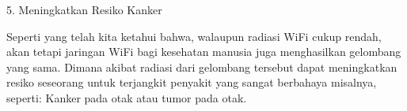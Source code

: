 5. Meningkatkan Resiko Kanker

   Seperti yang telah kita ketahui bahwa, walaupun radiasi WiFi cukup rendah, akan tetapi jaringan WiFi bagi kesehatan manusia juga menghasilkan 
   gelombang yang sama. Dimana akibat radiasi dari gelombang tersebut dapat meningkatkan resiko seseorang untuk terjangkit penyakit yang sangat berbahaya
   misalnya, seperti: Kanker pada otak atau tumor pada otak.
